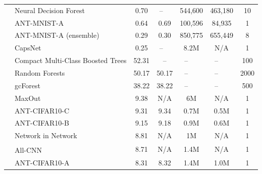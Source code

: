 \begin{table}[ht!]
\begin{tabular}{|c|l|cc|cc|c|}
		& Neural Decision Forest \cite{kontschieder2015deep} & 0.70 & --~~ & 544,600 & 463,180 & 10\\
		&\cellcolor{gray!10}ANT-MNIST-A &\cellcolor{gray!10} 0.64 &\cellcolor{gray!10} 0.69 &\cellcolor{gray!10} 100,596&\cellcolor{gray!10} 84,935 &\cellcolor{gray!10} 1\\
		&\cellcolor{gray!10}ANT-MNIST-A (ensemble) &\cellcolor{gray!10} 0.29 &\cellcolor{gray!10} 0.30 &\cellcolor{gray!10} 850,775 &\cellcolor{gray!10} 655,449 &\cellcolor{gray!10} 8 \\
		& CapsNet \cite{sabour2017dynamic} & 0.25 & --~~ & 8.2M & N/A & 1\\
		\hline
		\parbox[t]{2mm}{}                
		& Compact Multi-Class Boosted Trees \cite{ponomareva2017compact} & 52.31 & -- & --~~~  & --~~~ &100 \\
		& Random Forests  \cite{breiman2001random}& 50.17 & 50.17 & --~~~ & --~~~ &2000\\
		& gcForest \cite{zhou2017deepft} & 38.22&  38.22 & --~~~  & --~~~  & 500\\
		& MaxOut \cite{goodfellow2013maxout} & 9.38 & N/A& 6M & N/A & 1\\
		&ANT-CIFAR10-C & 9.31 &   9.34&  0.7M & 0.5M & 1\\
		&ANT-CIFAR10-B & 9.15 &   9.18&  0.9M &0.6M& 1\\
		& Network in Network \cite{lin2013network} & 8.81 & N/A & 1M  &N/A &1 \\
		& All-CNN\textsuperscript{\textdagger}\cite{springenberg2014striving} & 8.71 & N/A & 1.4M  & N/A &1 \\
		&ANT-CIFAR10-A & 8.31 &   8.32 &1.4M&1.0M & 1\\

\end{tabular}
\end{table}
